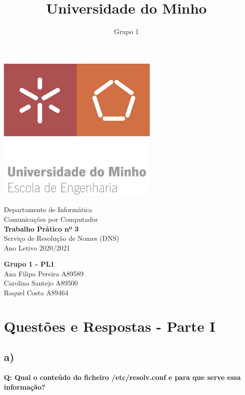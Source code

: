 \documentclass[a4paper]{article}
\title{Universidade do Minho}
\author{Grupo 1}
\date{}
\begin{document}
\begin{center}
	\includegraphics[scale=0.5]{images/um}
\end{center}


\begin{center}
	\vspace{14ex}
	\LARGE
	Departamento de Informática\\	
	\Huge
	Comunicações por Computador\\
	\vspace{7ex}
	\textbf{{
			\LARGE Trabalho Prático nº 3
	}}\\
	\vspace{5ex}
	{\large 
		Serviço de Resolução de Nomes (DNS)\\
		Ano Letivo 2020/2021
	}
	\vspace{6ex}
\end{center}



\textbf{Grupo 1 - PL1}\\

Ana Filipa Pereira		A89589\\
Carolina Santejo		A89500  \\
Raquel Costa			A89464 \\




\newpage

\tableofcontents

\newpage


\section{Questões e Respostas - Parte I }


\subsection{ a)} \textbf{Q: Qual o conteúdo do ficheiro /etc/resolv.conf e para que serve essa informação?} \par
\end{document}
